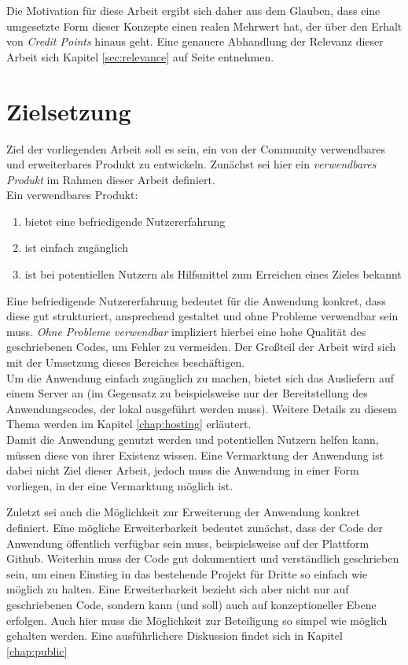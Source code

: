 Die Motivation für diese Arbeit ergibt sich daher aus dem Glauben, dass eine umgesetzte Form dieser Konzepte einen realen Mehrwert hat, der über den Erhalt von \textit{Credit Points} hinaus geht.
Eine genauere Abhandlung der Relevanz dieser Arbeit sich Kapitel \ref{sec:relevance} auf Seite entnehmen.

\section{Zielsetzung}
\label{chap:goal}
Ziel der vorliegenden Arbeit soll es sein, ein von der Community verwendbares und erweiterbares Produkt zu entwickeln. Zunächst sei hier ein \textit{verwendbares Produkt} im Rahmen dieser Arbeit definiert.\\
Ein verwendbares Produkt:

\begin{enumerate}
  \item bietet eine befriedigende Nutzererfahrung
  \item ist einfach zugänglich
  \item ist bei potentiellen Nutzern als Hilfsmittel zum Erreichen eines Zieles bekannt
\end{enumerate}

Eine befriedigende Nutzererfahrung bedeutet für die Anwendung konkret, dass diese gut strukturiert, ansprechend gestaltet und ohne Probleme verwendbar sein muss. \textit{Ohne Probleme verwendbar} impliziert hierbei eine hohe Qualität des geschriebenen Codes, um Fehler zu vermeiden. Der Großteil der Arbeit wird sich mit der Umsetzung dieses Bereiches beschäftigen.\\
Um die Anwendung einfach zugänglich zu machen, bietet sich das Ausliefern auf einem Server an (im Gegensatz zu beispielsweise nur der Bereitstellung des Anwendungscodes, der lokal ausgeführt werden muss). Weitere Details zu diesem Thema werden im Kapitel \ref{chap:hosting} erläutert.\\
Damit die Anwendung genutzt werden und potentiellen Nutzern helfen kann, müssen diese von ihrer Existenz wissen. Eine Vermarktung der Anwendung ist dabei nicht Ziel dieser Arbeit, jedoch muss die Anwendung in einer Form vorliegen, in der eine Vermarktung möglich ist.

Zuletzt sei auch die Möglichkeit zur Erweiterung der Anwendung konkret definiert. Eine mögliche Erweiterbarkeit bedeutet zunächst, dass der Code der Anwendung öffentlich verfügbar sein muss, beispielsweise auf der Plattform Github\footnotemark{}. Weiterhin muss der Code gut dokumentiert und verständlich geschrieben sein, um einen Einstieg in das bestehende Projekt für Dritte so einfach wie möglich zu halten. Eine Erweiterbarkeit bezieht sich aber nicht nur auf geschriebenen Code, sondern kann (und soll) auch auf konzeptioneller Ebene erfolgen. Auch hier muss die Möglichkeit zur Beteiligung so simpel wie möglich gehalten werden. Eine ausführlichere Diskussion findet sich in Kapitel \ref{chap:public}\\

